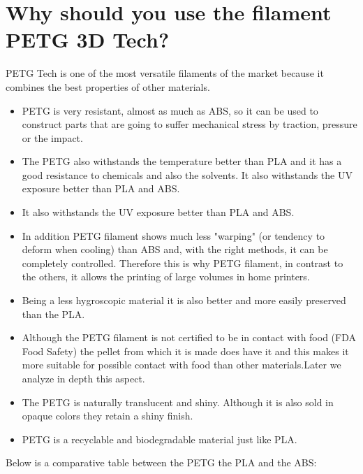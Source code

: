 \documentclass[11pt,a4paper]{article}
\begin{document}
\section{Why should you use the filament PETG 3D Tech?}PETG Tech is one of the most versatile filaments of the market because it combines the best properties of other materials.
\begin{itemize}
\item PETG is very resistant, almost as much as ABS, so it can be used to construct parts that are going to suffer mechanical stress by traction, pressure or the impact.
\item The PETG also withstands the temperature better than PLA and it has a good resistance to chemicals and also the solvents. It also withstands the UV exposure better than PLA and ABS.
\item It also withstands the UV exposure better than PLA and ABS.
\item In addition PETG filament shows much less "warping" (or tendency to deform when cooling) than ABS and, with the right methods, it can be completely controlled. Therefore this is why PETG filament, in contrast to the others, it allows the printing of large volumes in home printers.
\item Being a less hygroscopic material it is also better and more easily preserved than the PLA.
\item Although the PETG filament is not certified to be in contact with food (FDA Food Safety) the pellet from which it is made does have it and this makes it more suitable for possible contact with food than other materials.Later we analyze in depth this aspect.
\item The PETG is naturally translucent and shiny. Although it is also sold in opaque colors they retain a shiny finish.
\item PETG is a recyclable and biodegradable material just like PLA.
\end{itemize}
Below is a comparative table between the PETG the PLA and the ABS:
\end{document}
